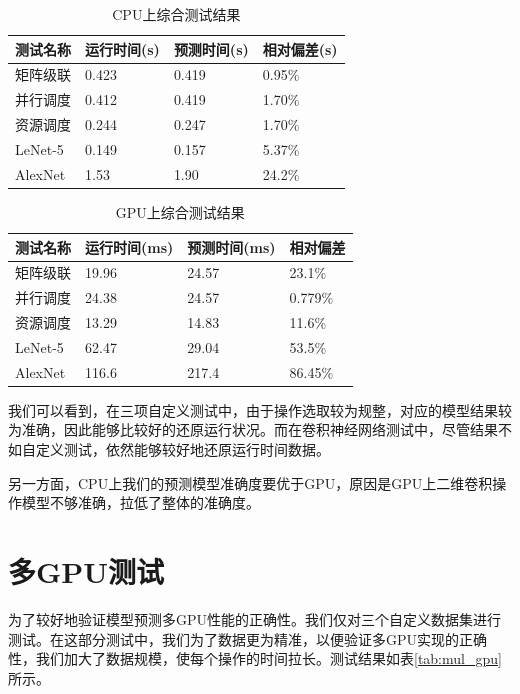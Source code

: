     \begin{table}[!htbp]
        \centering
	    \caption{CPU上综合测试结果}
        \label{tab:pre_cpu}
        \begin{tabular}{|l|l|l|l|}
            \hline
            测试名称 & 运行时间(s) & 预测时间(s) & 相对偏差(s)\\
            \hline
            矩阵级联 & 0.423 & 0.419 & 0.95\% \\
            \hline
            并行调度 & 0.412 & 0.419 & 1.70\% \\
            \hline
            资源调度 & 0.244 & 0.247 & 1.70\% \\
            \hline
            LeNet-5 & 0.149 & 0.157 & 5.37\% \\
            \hline
            AlexNet & 1.53 & 1.90 & 24.2\% \\
            \hline
        \end{tabular}
    \end{table}
    
    \begin{table}[!htbp]
        \centering
	    \caption{GPU上综合测试结果}
        \label{tab:pre_gpu}
        \begin{tabular}{|l|l|l|l|}
            \hline
            测试名称 & 运行时间(ms) & 预测时间(ms) & 相对偏差\\
            \hline
            矩阵级联 & 19.96 & 24.57 & 23.1\% \\
            \hline
            并行调度 & 24.38 & 24.57 & 0.779\% \\
            \hline
            资源调度 & 13.29 & 14.83 & 11.6\% \\
            \hline
            LeNet-5 & 62.47 & 29.04 & 53.5\% \\
            \hline
            AlexNet & 116.6 & 217.4 & 86.45\% \\
            \hline
        \end{tabular}
    \end{table}
    
    我们可以看到，在三项自定义测试中，由于操作选取较为规整，对应的模型结果较为准确，因此能够比较好的还原运行状况。而在卷积神经网络测试中，尽管结果不如自定义测试，依然能够较好地还原运行时间数据。
    
    另一方面，CPU上我们的预测模型准确度要优于GPU，原因是GPU上二维卷积操作模型不够准确，拉低了整体的准确度。

\section{多GPU测试}
    为了较好地验证模型预测多GPU性能的正确性。我们仅对三个自定义数据集进行测试。在这部分测试中，我们为了数据更为精准，以便验证多GPU实现的正确性，我们加大了数据规模，使每个操作的时间拉长。测试结果如表\ref{tab:mul_gpu}所示。
    
